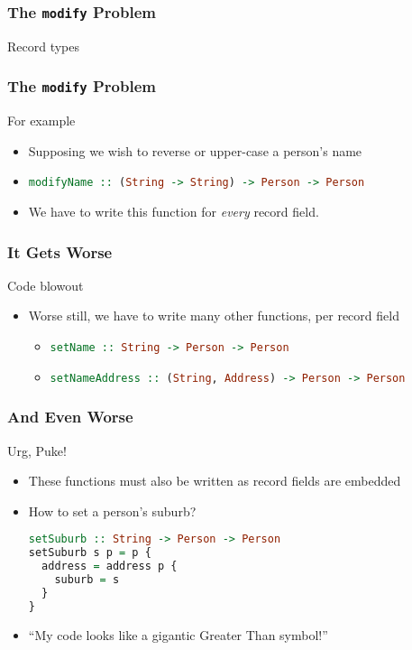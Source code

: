 \begin{frame}
\frametitle{The \lstinline$modify$ Problem}

\begin{block}{Record types}

\end{block}

\end{frame}

\begin{frame}
\frametitle{The \lstinline$modify$ Problem}

\begin{block}{For example}
\begin{itemize}
\item Supposing we wish to reverse or upper-case a person's name
\item \lstinline[language=haskell]$modifyName :: (String -> String) -> Person -> Person$
\item We have to write this function for \emph{every} record field.
\end{itemize}
\end{block}

\end{frame}

\begin{frame}
\frametitle{It Gets Worse}

\begin{block}{Code blowout}
\begin{itemize}
\item Worse still, we have to write many other functions, per record field
  \begin{itemize}
  \item \lstinline[language=haskell]$setName :: String -> Person -> Person$
  \item \lstinline[language=haskell]$setNameAddress :: (String, Address) -> Person -> Person$
  \end{itemize}
\end{itemize}
\end{block}

\end{frame}

\begin{frame}[fragile]
\frametitle{And Even Worse}

\begin{block}{Urg, Puke!}
\begin{itemize}
\item These functions must also be written as record fields are embedded
\item How to set a person's suburb?
\begin{lstlisting}[language=haskell]
setSuburb :: String -> Person -> Person
setSuburb s p = p {
  address = address p {
    suburb = s
  }
}
\end{lstlisting}
\item ``My code looks like a gigantic Greater Than symbol!''

\end{itemize}
\end{block}

\end{frame}

